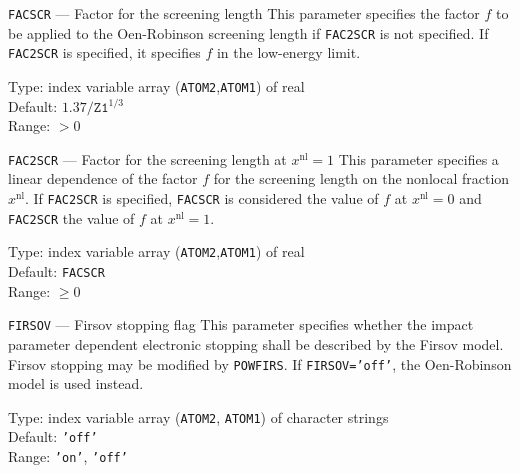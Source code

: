 \begin{keydescription}{\texttt{FACSCR} --- Factor for the screening length}
%
  This parameter specifies the factor $f$ to be applied to the
  Oen-Robinson screening length if \texttt{FAC2SCR} is not specified.
  If \texttt{FAC2SCR} is specified, it specifies $f$ in the low-energy
  limit.
  \begin{keytab}
    Type:    \> index variable array (\texttt{ATOM2},\texttt{ATOM1}) 
                of real \\
    Default: \> $1.37 / \texttt{Z1}^{1/3}$ \\
    Range:   \> $> 0$
\end{keytab}
\end{keydescription}

\begin{keydescription}{\texttt{FAC2SCR} --- Factor for the screening length
  at $x^\mathrm{nl}=1$}
%
  This parameter specifies a linear dependence of the factor $f$ for the 
  screening length on the nonlocal fraction $x^\mathrm{nl}$. If 
  \texttt{FAC2SCR} is specified, \texttt{FACSCR} is considered the value 
  of $f$ at $x^\mathrm{nl} = 0$ and \texttt{FAC2SCR} the value 
  of $f$ at $x^\mathrm{nl} = 1$. 
  \begin{keytab}
    Type:    \> index variable array (\texttt{ATOM2},\texttt{ATOM1}) 
                of real \\
    Default: \> \texttt{FACSCR} \\
    Range:   \> $\ge 0$
  \end{keytab}
\end{keydescription}

\begin{keydescription}{\texttt{FIRSOV} --- Firsov stopping flag}
%
  This parameter specifies whether the impact parameter dependent electronic 
  stopping shall be described by the Firsov model. Firsov stopping may 
  be  modified by \texttt{POWFIRS}. If \texttt{FIRSOV='off'}, the Oen-Robinson
  model is used instead.
  \begin{keytab}
    Type:    \> index variable array (\texttt{ATOM2}, \texttt{ATOM1})
                of character strings \\
    Default: \> \texttt{'off'} \\
    Range:   \> \texttt{'on'}, \texttt{'off'}
  \end{keytab}
\end{keydescription}

